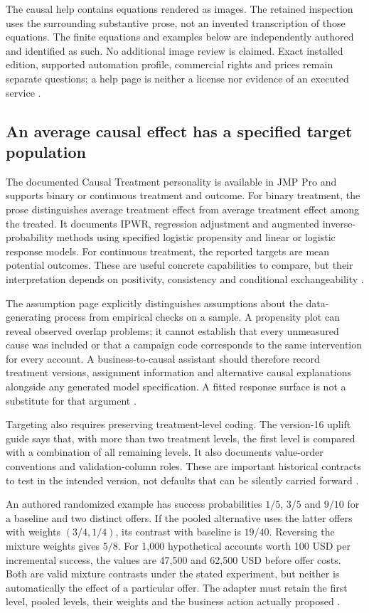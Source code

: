 The causal help contains equations rendered as images. The retained
inspection uses the surrounding substantive prose, not an invented
transcription of those equations. The finite equations and examples below
are independently authored and identified as such. No additional image
review is claimed. Exact installed edition, supported automation profile,
commercial rights and prices remain separate questions; a help page is
neither a license nor evidence of an executed service
\cite{exec24_jmp_choice}.

\subsection{An average causal effect has a specified target population}
The documented Causal Treatment personality is available in JMP Pro and
supports binary or continuous treatment and outcome. For binary treatment,
the prose distinguishes average treatment effect from average treatment
effect among the treated. It documents IPWR, regression adjustment and
augmented inverse-probability methods using specified logistic propensity
and linear or logistic response models. For continuous treatment, the
reported targets are mean potential outcomes. These are useful concrete
capabilities to compare, but their interpretation depends on positivity,
consistency and conditional exchangeability
\cite{exec13_ch_jmp_causal}.

The assumption page explicitly distinguishes assumptions about the
data-generating process from empirical checks on a sample. A propensity
plot can reveal observed overlap problems; it cannot establish that every
unmeasured cause was included or that a campaign code corresponds to the
same intervention for every account. A business-to-causal assistant should
therefore record treatment versions, assignment information and alternative
causal explanations alongside any generated model specification. A fitted
response surface is not a substitute for that argument
\cite{exec13_ch_jmp_causal,exec24_jmp_choice}.

Targeting also requires preserving treatment-level coding. The version-16
uplift guide says that, with more than two treatment levels, the first
level is compared with a combination of all remaining levels. It also
documents value-order conventions and validation-column roles. These are
important historical contracts to test in the intended version, not
defaults that can be silently carried forward
\cite{exec13_ch_jmp_uplift}.

An authored randomized example has success probabilities $1/5$, $3/5$
and $9/10$ for a baseline and two distinct offers. If the pooled alternative
uses the latter offers with weights $(3/4,1/4)$, its contrast with baseline
is $19/40$. Reversing the mixture weights gives $5/8$. For 1,000
hypothetical accounts worth 100 USD per incremental success, the values
are 47,500 and 62,500 USD before offer costs. Both are valid mixture
contrasts under the stated experiment, but neither is automatically the
effect of a particular offer. The adapter must retain the first level,
pooled levels, their weights and the business action actually proposed
\cite{exec24_jmp_choice}.

